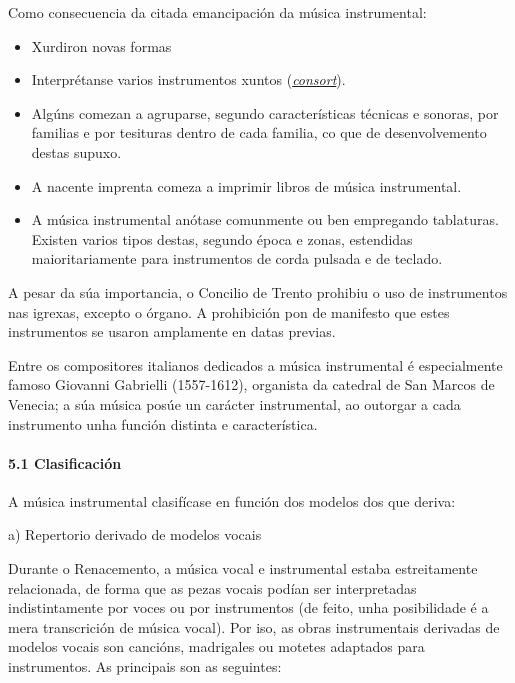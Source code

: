 \documentclass[
]{article}
\begin{document}
Como consecuencia da citada emancipación da música instrumental:

\begin{itemize}
\item
  Xurdiron novas formas
\item
  Interprétanse varios instrumentos xuntos
  (\href{http://es.wikipedia.org/wiki/Consort}{\emph{consort}}).
\item
  Algúns comezan a agruparse, segundo características técnicas e
  sonoras, por familias e por tesituras dentro de cada familia, co que
  de desenvolvemento destas supuxo.
\item
  A nacente imprenta comeza a imprimir libros de música instrumental.
\item
  A música instrumental anótase comunmente ou ben empregando tablaturas.
  Existen varios tipos destas, segundo época e zonas, estendidas
  maioritariamente para instrumentos de corda pulsada e de teclado.
\end{itemize}

A pesar da súa importancia, o Concilio de Trento prohibiu o uso de
instrumentos nas igrexas, excepto o órgano. A prohibición pon de
manifesto que estes instrumentos se usaron amplamente en datas previas.

Entre os compositores italianos dedicados a música instrumental é
especialmente famoso Giovanni Gabrielli (1557-1612), organista da
catedral de San Marcos de Venecia; a súa música posúe un carácter
instrumental, ao outorgar a cada instrumento unha función distinta e
característica.

\hypertarget{51-clasificaciuxf3n}{%
\paragraph{\texorpdfstring{\textbf{5.1
Clasificación}}{5.1 Clasificación}}\label{51-clasificaciuxf3n}}

A música instrumental clasifícase en función dos modelos dos que deriva:

a) Repertorio derivado de modelos vocais

Durante o Renacemento, a música vocal e instrumental estaba
estreitamente relacionada, de forma que as pezas vocais podían ser
interpretadas indistintamente por voces ou por instrumentos (de feito,
unha posibilidade é a mera transcrición de música vocal). Por iso, as
obras instrumentais derivadas de modelos vocais son cancións, madrigales
ou motetes adaptados para instrumentos. As principais son as seguintes:
\end{document}
